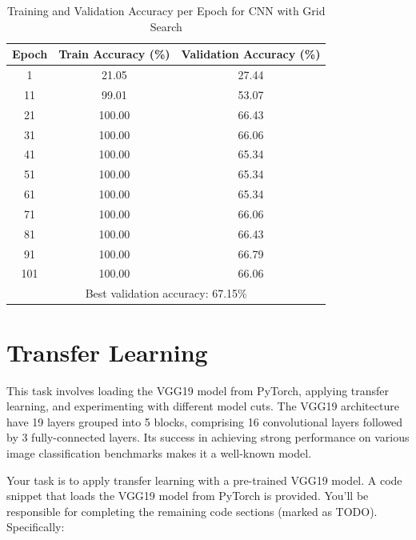 \documentclass[11pt]{scrartcl}
\begin{document}
\begin{table}[htbp]
\centering
\caption{Training and Validation Accuracy per Epoch for CNN with Grid Search}
\begin{tabular}{ccc}
\toprule
\textbf{Epoch} & \textbf{Train Accuracy (\%)} & \textbf{Validation Accuracy (\%)} \\
\midrule
1    & 21.05 & 27.44 \\
11   & 99.01 & 53.07 \\
21   & 100.00 & 66.43 \\
31   & 100.00 & 66.06 \\
41   & 100.00 & 65.34 \\
51   & 100.00 & 65.34 \\
61   & 100.00 & 65.34 \\
71   & 100.00 & 66.06 \\
81   & 100.00 & 66.43 \\
91   & 100.00 & 66.79 \\
101  & 100.00 & 66.06 \\
\midrule
\multicolumn{3}{c}{Best validation accuracy: 67.15\%} \\
\bottomrule
\end{tabular}
\label{tab:task2-bonus-accuracy}
\end{table}


\newpage
\section{Transfer Learning}

This task involves loading the VGG19 model from PyTorch, 
applying transfer learning, and experimenting with different model cuts. 
The VGG19 architecture have 19 layers grouped into 5 blocks, 
comprising 16 convolutional layers followed by 3 fully-connected layers. 
Its success in achieving strong performance on various image classification benchmarks 
makes it a well-known model.

Your task is to apply transfer learning with a pre-trained VGG19 model. 
A code snippet that loads the VGG19 model from PyTorch is provided. 
You'll be responsible for completing the remaining code sections (marked as TODO). 
Specifically:
\end{document}
